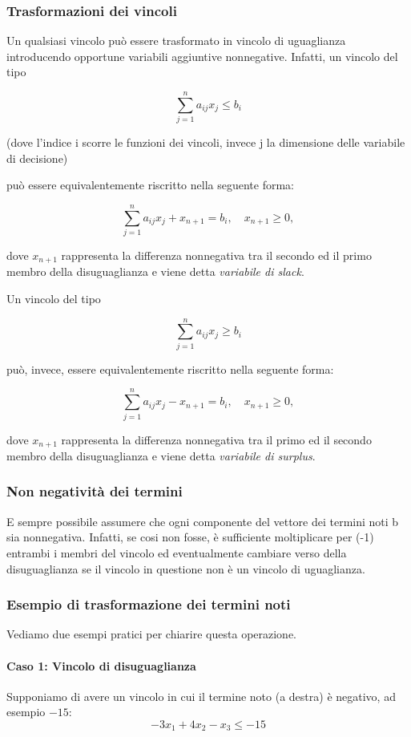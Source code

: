 \subsubsection{Trasformazioni dei vincoli}

Un qualsiasi vincolo può essere trasformato in vincolo di uguaglianza introducendo opportune variabili aggiuntive nonnegative. Infatti, un vincolo del tipo

$$ \sum_{j=1}^{n} a_{ij}x_j \le b_i $$

(dove l'indice i scorre le funzioni dei vincoli, invece j la dimensione delle variabile di decisione)

può essere equivalentemente riscritto nella seguente forma:

$$ \sum_{j=1}^{n} a_{ij}x_j + x_{n+1} = b_i, \quad x_{n+1} \ge 0, $$

dove $x_{n+1}$ rappresenta la differenza nonnegativa tra il secondo ed il primo membro della disuguaglianza e viene detta \textit{variabile di slack}.

Un vincolo del tipo

$$ \sum_{j=1}^{n} a_{ij}x_j \ge b_i $$

può, invece, essere equivalentemente riscritto nella seguente forma:

$$ \sum_{j=1}^{n} a_{ij}x_j - x_{n+1} = b_i, \quad x_{n+1} \ge 0, $$

dove $x_{n+1}$ rappresenta la differenza nonnegativa tra il primo ed il secondo membro della disuguaglianza e viene detta \textit{variabile di surplus}.



\subsubsection{Non negatività dei termini}
E sempre possibile assumere che ogni componente del vettore dei termini
noti b sia nonnegativa. Infatti, se cosi non fosse, è sufficiente moltiplicare per
(-1) entrambi i membri del vincolo ed eventualmente cambiare verso della
disuguaglianza se il vincolo in questione non è un vincolo di uguaglianza.
\subsubsection{Esempio di trasformazione dei termini noti}

Vediamo due esempi pratici per chiarire questa operazione.

\paragraph{Caso 1: Vincolo di disuguaglianza}
Supponiamo di avere un vincolo in cui il termine noto (a destra) è negativo, ad esempio $-15$:
$$ -3x_1 + 4x_2 - x_3 \le -15 $$

